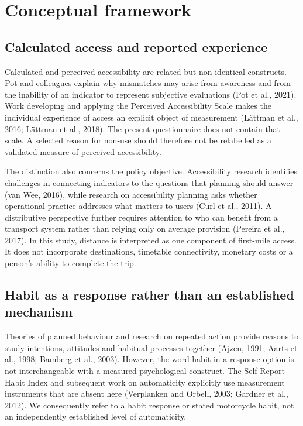\documentclass[
  11pt,
  a4paper,
]{article}
\begin{document}
\section{Conceptual framework}\label{conceptual-framework}

\subsection{Calculated access and reported
experience}\label{calculated-access-and-reported-experience}

Calculated and perceived accessibility are related but non-identical
constructs. Pot and colleagues explain why mismatches may arise from
awareness and from the inability of an indicator to represent subjective
evaluations (Pot et al., 2021). Work developing and applying the
Perceived Accessibility Scale makes the individual experience of access
an explicit object of measurement (Lättman et al., 2016; Lättman et al.,
2018). The present questionnaire does not contain that scale. A selected
reason for non-use should therefore not be relabelled as a validated
measure of perceived accessibility.

The distinction also concerns the policy objective. Accessibility
research identifies challenges in connecting indicators to the questions
that planning should answer (van Wee, 2016), while research on
accessibility planning asks whether operational practice addresses what
matters to users (Curl et al., 2011). A distributive perspective further
requires attention to who can benefit from a transport system rather
than relying only on average provision (Pereira et al., 2017). In this
study, distance is interpreted as one component of first-mile access. It
does not incorporate destinations, timetable connectivity, monetary
costs or a person's ability to complete the trip.

\subsection{Habit as a response rather than an established
mechanism}\label{habit-as-a-response-rather-than-an-established-mechanism}

Theories of planned behaviour and research on repeated action provide
reasons to study intentions, attitudes and habitual processes together
(Ajzen, 1991; Aarts et al., 1998; Bamberg et al., 2003). However, the
word habit in a response option is not interchangeable with a measured
psychological construct. The Self-Report Habit Index and subsequent work
on automaticity explicitly use measurement instruments that are absent
here (Verplanken and Orbell, 2003; Gardner et al., 2012). We
consequently refer to a habit response or stated motorcycle habit, not
an independently established level of automaticity.
\end{document}
